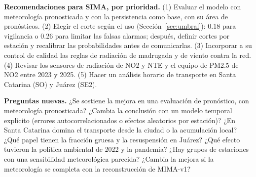 \textbf{Recomendaciones para SIMA, por prioridad.} (1) Evaluar el modelo con meteorología pronosticada y con la persistencia como base, con su área de pronósticos. (2) Elegir el corte según el uso (Sección~\ref{sec:umbral}): 0.18 para vigilancia o 0.26 para limitar las falsas alarmas; después, definir cortes por estación y recalibrar las probabilidades antes de comunicarlas. (3) Incorporar a su control de calidad las reglas de radiación de madrugada y de viento contra la red. (4) Revisar los sensores de radiación de NO2 y NTE y el equipo de PM2.5 de NO2 entre 2023 y 2025. (5) Hacer un análisis horario de transporte en Santa Catarina (SO) y Juárez (SE2).

\textbf{Preguntas nuevas.} ¿Se sostiene la mejora en una evaluación de pronóstico, con meteorología pronosticada? ¿Cambia la conclusión con un modelo temporal explícito (errores autocorrelacionados o efectos aleatorios por estación)? ¿En Santa Catarina domina el transporte desde la ciudad o la acumulación local? ¿Qué papel tienen la fracción gruesa y la resuspensión en Juárez? ¿Qué efecto tuvieron la política ambiental de 2022 y la pandemia? ¿Hay grupos de estaciones con una sensibilidad meteorológica parecida? ¿Cambia la mejora si la meteorología se completa con la reconstrucción de MIMA-v1?
